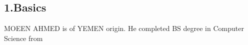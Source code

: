 \begin{resume}	
	\section*{1.\hspace{0.75em}Basics}
	MOEEN AHMED is of YEMEN origin. He completed BS degree in Computer Science from 
	
\end{resume}
